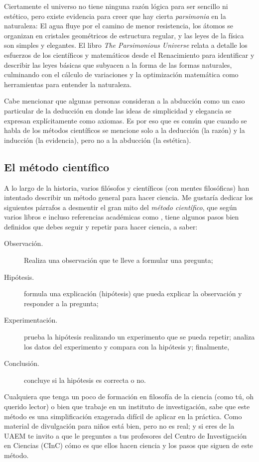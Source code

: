 Ciertamente el universo no tiene ninguna razón lógica para ser sencillo ni estético, pero existe evidencia para creer que hay cierta \emph{parsimonia} en la naturaleza: El agua fluye por el camino de menor resistencia, los átomos se organizan en cristales geométricos de estructura regular, y las leyes de la física son simples y elegantes.
El libro \emph{The Parsimonious Universe}\cite{Hildebrandt2012} relata a detalle los esfuerzos de los científicos y matemáticos desde el Renacimiento para identificar y describir las leyes básicas que subyacen a la forma de las formas naturales, culminando con el cálculo de variaciones y la optimización matemática como herramientas para entender la naturaleza.

Cabe mencionar que algunas personas consideran a la abducción como un caso particular de la deducción en donde las ideas de simplicidad y elegancia se expresan explícitamente como axiomas.
Es por eso que es común que cuando se habla de los métodos científicos se mencione solo a la deducción (la razón) y la inducción (la evidencia), pero no a la abducción (la estética).

\subsection*{El método científico}
\label{sub:elmetodocientifico}
A lo largo de la historia, varios filósofos y científicos (con mentes filosóficas) han intentado describir un método general para hacer ciencia.
Me gustaría dedicar los siguientes párrafos a desmentir el gran mito del \emph{método científico}, que según varios libros e incluso referencias académicas como \cite{Crawford1990}, tiene algunos pasos bien definidos que debes seguir y repetir para hacer ciencia, a saber: \begin{description} \item[Observación.] Realiza una observación que te lleve a formular una pregunta; \item[Hipótesis.] formula una explicación (hipótesis) que pueda explicar la observación y responder a la pregunta; \item[Experimentación.] prueba la hipótesis realizando un experimento que se pueda repetir; analiza los datos del experimento y compara con la hipótesis y; finalmente, \item[Conclusión.] concluye si la hipótesis es correcta o no.
\end{description} Cualquiera que tenga un poco de formación en filosofía de la ciencia (como tú, oh querido lector) o bien que trabaje en un instituto de investigación, sabe que este método es una simplificación exagerada difícil de aplicar en la práctica.
Como material de divulgación para niños está bien, pero no es real; y si eres de la UAEM te invito a que le preguntes a tus profesores del Centro de Investigación en Ciencias (CInC) cómo es que ellos hacen ciencia y los pasos que siguen de este método.

